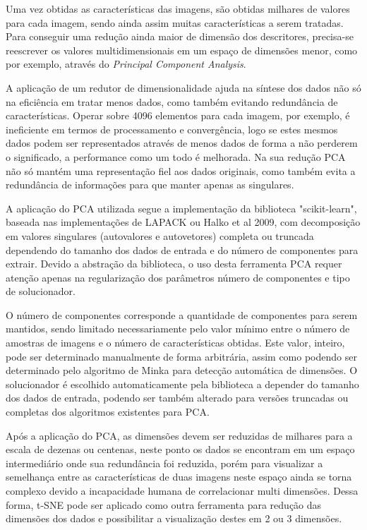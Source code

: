\documentclass[12pt]{report}
\begin{document}
Uma vez obtidas as características das imagens, são obtidas milhares de valores para cada imagem, sendo ainda assim muitas características a serem tratadas. Para conseguir uma redução ainda maior de dimensão dos descritores, precisa-se reescrever os valores multidimensionais em um espaço de dimensões menor, como por exemplo, através do \textit{Principal Component Analysis}. 

A aplicação de um redutor de dimensionalidade ajuda na síntese dos dados não só na eficiência em tratar menos dados, como também evitando redundância de características. Operar sobre 4096 elementos para cada imagem, por exemplo, é ineficiente em termos de processamento e convergência, logo se estes mesmos dados podem ser representados através de menos dados de forma a não perderem o significado, a performance como um todo é melhorada. Na sua redução PCA não só mantém uma representação fiel aos dados originais, como também evita a redundância de informações para que manter apenas as singulares.

A aplicação do PCA utilizada segue a implementação da biblioteca "scikit-learn", baseada nas implementações de LAPACK ou Halko et al 2009, com decomposição em valores singulares (autovalores e autovetores) completa ou truncada dependendo do tamanho dos dados de entrada e do número de componentes para extrair. Devido a abstração da biblioteca, o uso desta ferramenta PCA requer atenção apenas na regularização dos parâmetros número de componentes e tipo de solucionador. 


O número de componentes corresponde a quantidade de componentes para serem mantidos, sendo limitado necessariamente pelo valor mínimo entre o número de amostras de imagens e o número de características obtidas. Este valor, inteiro, pode ser determinado manualmente de forma arbitrária, assim como podendo ser determinado pelo algoritmo de  Minka para detecção automática de dimensões. O solucionador é escolhido automaticamente pela biblioteca a depender do tamanho dos dados de entrada, podendo ser também alterado para versões truncadas ou completas dos algoritmos existentes para PCA.

Após a aplicação do PCA, as dimensões devem ser reduzidas de milhares para a escala de dezenas ou centenas, neste ponto os dados se encontram em um espaço intermediário onde sua redundância foi reduzida, porém para visualizar a semelhança entre as características de duas imagens neste espaço ainda se torna complexo devido a incapacidade humana de correlacionar multi dimensões. Dessa forma, t-SNE pode ser aplicado como outra ferramenta para redução das dimensões dos dados e possibilitar a visualização destes em 2 ou 3 dimensões. 
\end{document}

